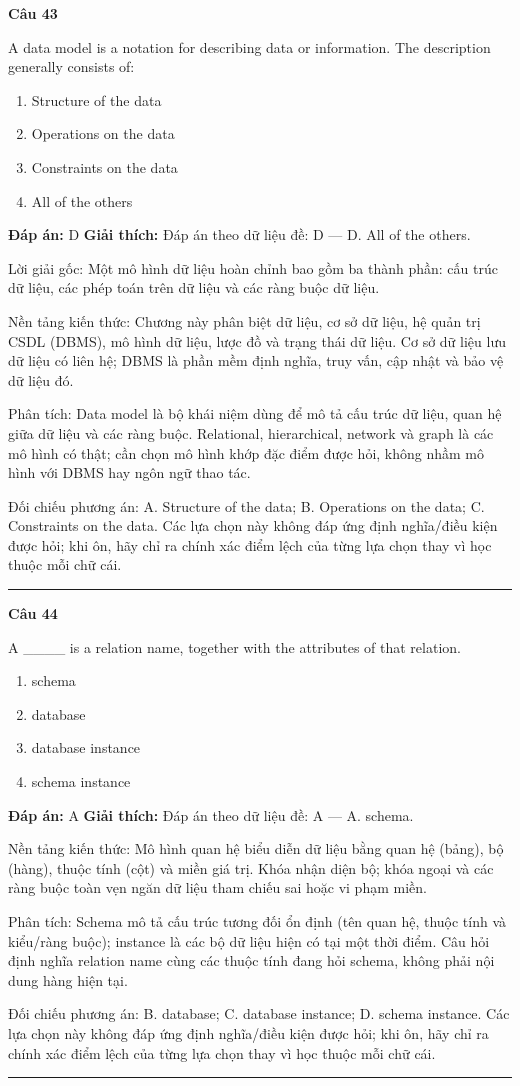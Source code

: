 \documentclass[11pt,a4paper]{article}
\newenvironment{question}[1]{%
  \par\vspace{1em}\noindent\textbf{\large Câu #1}\par\vspace{0.4em}
}{%
  \par\vspace{1em}\hrule\vspace{0.6em}
}
\newenvironment{choices}{%
  \begin{enumerate}[label=\textbf{\Alph*.},leftmargin=2.2em,itemsep=2pt,topsep=3pt]
}{%
  \end{enumerate}
}
\newcommand{\choice}{\item}
\begin{document}
\begin{question}{43}
A data model is a notation for describing data or information. The description generally consists of:
\begin{choices}
\choice Structure of the data
\choice Operations on the data
\choice Constraints on the data
\choice All of the others
\end{choices}
\textbf{Đáp án:} D
\textbf{Giải thích:} Đáp án theo dữ liệu đề: D — D. All of the others.

Lời giải gốc: Một mô hình dữ liệu hoàn chỉnh bao gồm ba thành phần: cấu trúc dữ liệu, các phép toán trên dữ liệu và các ràng buộc dữ liệu.

Nền tảng kiến thức: Chương này phân biệt dữ liệu, cơ sở dữ liệu, hệ quản trị CSDL (DBMS), mô hình dữ liệu, lược đồ và trạng thái dữ liệu. Cơ sở dữ liệu lưu dữ liệu có liên hệ; DBMS là phần mềm định nghĩa, truy vấn, cập nhật và bảo vệ dữ liệu đó.

Phân tích: Data model là bộ khái niệm dùng để mô tả cấu trúc dữ liệu, quan hệ giữa dữ liệu và các ràng buộc. Relational, hierarchical, network và graph là các mô hình có thật; cần chọn mô hình khớp đặc điểm được hỏi, không nhầm mô hình với DBMS hay ngôn ngữ thao tác.

Đối chiếu phương án: A. Structure of the data; B. Operations on the data; C. Constraints on the data. Các lựa chọn này không đáp ứng định nghĩa/điều kiện được hỏi; khi ôn, hãy chỉ ra chính xác điểm lệch của từng lựa chọn thay vì học thuộc mỗi chữ cái.
\end{question}

\begin{question}{44}
A ____ is a relation name, together with the attributes of that relation.
\begin{choices}
\choice schema
\choice database
\choice database instance
\choice schema instance
\end{choices}
\textbf{Đáp án:} A
\textbf{Giải thích:} Đáp án theo dữ liệu đề: A — A. schema.

Nền tảng kiến thức: Mô hình quan hệ biểu diễn dữ liệu bằng quan hệ (bảng), bộ (hàng), thuộc tính (cột) và miền giá trị. Khóa nhận diện bộ; khóa ngoại và các ràng buộc toàn vẹn ngăn dữ liệu tham chiếu sai hoặc vi phạm miền.

Phân tích: Schema mô tả cấu trúc tương đối ổn định (tên quan hệ, thuộc tính và kiểu/ràng buộc); instance là các bộ dữ liệu hiện có tại một thời điểm. Câu hỏi định nghĩa relation name cùng các thuộc tính đang hỏi schema, không phải nội dung hàng hiện tại.

Đối chiếu phương án: B. database; C. database instance; D. schema instance. Các lựa chọn này không đáp ứng định nghĩa/điều kiện được hỏi; khi ôn, hãy chỉ ra chính xác điểm lệch của từng lựa chọn thay vì học thuộc mỗi chữ cái.
\end{question}
\end{document}
